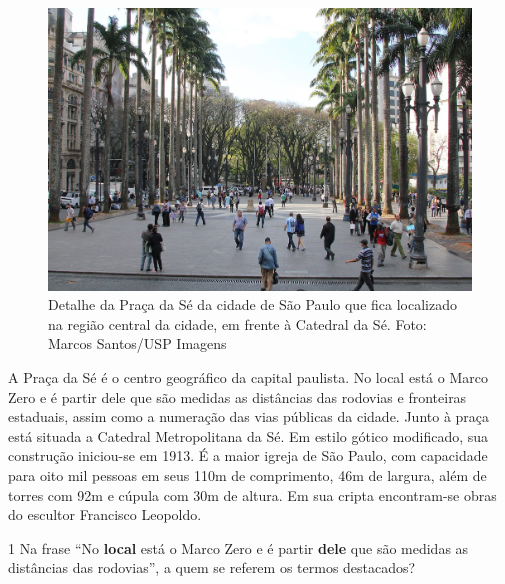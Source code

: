\begin{myquote}

\begin{figure}[H]
\includegraphics[width=\textwidth]{./imgSAEB_7_POR/media/image54.png}
\caption{Detalhe da Praça da Sé da cidade de São Paulo que fica localizado na região central da cidade, em frente à Catedral da Sé. Foto: Marcos Santos/USP Imagens}
\end{figure}


A Praça da Sé é o centro geográfico da capital paulista. No local está o Marco Zero 
e é partir dele que são medidas as distâncias das rodovias e fronteiras estaduais, 
assim como a numeração das vias públicas da cidade. Junto à praça está situada a 
Catedral Metropolitana da Sé. Em estilo gótico modificado, sua construção iniciou-se em 1913.
É a maior igreja de São Paulo, com capacidade para oito mil pessoas em seus 110m de comprimento, 
46m de largura, além de torres com 92m e cúpula com 30m de altura. Em sua cripta encontram-se
obras do escultor Francisco Leopoldo.


\end{myquote}

\num{1} Na frase ``No \textbf{local} está o Marco Zero e é partir \textbf{dele} que são medidas as distâncias das rodovias'', a quem se referem os termos destacados?
\enlargethispage{2\baselineskip}

